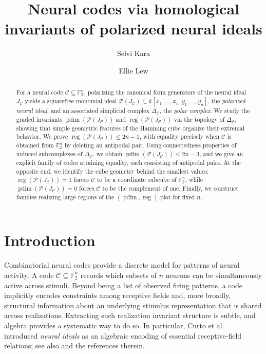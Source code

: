 \documentclass[12pt]{amsart}
\theoremstyle{remark}
\theoremstyle{definition}
\DeclareMathOperator{\reg}{reg}
\DeclareMathOperator{\pd}{pdim}
\newcommand{\F}{\mathbb{F}}
\newcommand{\C}{\mathcal{C}}
\def\P{{\mathcal P}}
\begin{document}
\title{Neural codes via homological invariants of polarized neural ideals}





\author{Selvi Kara}
\address{Department of Mathematics, Bryn Mawr College,  906 New Gulph Rd, Bryn Mawr, PA 19010, USA}


\author{Ellie Lew}
\address{Department of Mathematics, University of California, One Shields Avenue, Davis, CA 95616-8633, USA}






\begin{abstract}
For a neural code $\C\subseteq\F_2^n$, polarizing the canonical form generators of the neural ideal $J_\C$
yields a squarefree monomial ideal $\P(J_\C)\subset k[x_1,\dots,x_n,y_1,\dots,y_n]$, the \emph{polarized neural ideal}, and an associated
simplicial complex $\Delta_\C$, the \emph{polar complex}.  We study the graded invariants
$\pd(\P(J_\C))$ and $\reg(\P(J_\C))$ via the topology of $\Delta_\C$, showing that simple geometric
features of the Hamming cube  organize their extremal behavior. 
We prove $\reg(\P(J_\C))\le 2n-1$, with equality precisely when $\C$ is obtained from $\F_2^n$ by deleting
an antipodal pair. Using connectedness properties of induced subcomplexes of
$\Delta_\C$, we obtain $\pd(\P(J_\C))\le 2n-3$, and we give an explicit family of codes attaining equality, each consisting of antipodal pairs.
At the opposite end, we identify the cube geometry behind the smallest values: $\reg(\P(J_\C))=1$ forces $\C$
to be a coordinate subcube of $\F_2^n$, while $\pd(\P(J_\C))=0$ forces $\C$ to be the complement of one.
Finally, we construct families realizing large regions of the $(\pd,\reg)$-plot for fixed $n$.
\end{abstract}






\maketitle

\section{Introduction}\label{sec:intro}
Combinatorial neural codes provide a discrete model for patterns of neural activity.  A code
$\C\subseteq \F_2^n$ records which subsets of $n$ neurons can be simultaneously active across stimuli.
Beyond being a list of observed firing patterns, a code implicitly encodes constraints among receptive
fields and, more broadly, structural information about an underlying stimulus representation that is
shared across realizations.  Extracting such realization invariant structure is subtle, and algebra
provides a systematic way to do so.  In particular, Curto et al.~\cite{smb}
introduced \emph{neural ideals} as an algebraic encoding of essential receptive-field relations; see also
\cite{acc,rgg, youngsphd} and the references therein.
\end{document}
